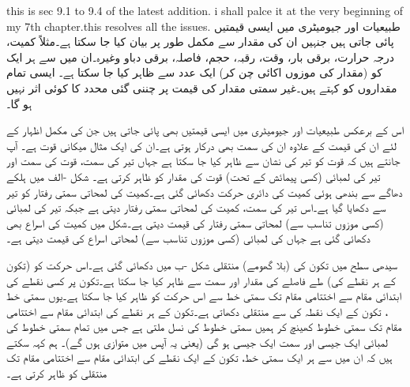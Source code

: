 this is sec 9.1 to 9.4 of the latest addition. i shall palce it at the very beginning of my 7th chapter.this resolves all the issues.
طبیعیات اور جیومیٹری میں ایسی قیمتیں پائی جاتی ہیں جنہیں ان کی مقدار سے مکمل طور پر بیان کیا جا سکتا ہے۔مثلاً  کمیت، درجہ حرارت، برقی بار، وقت، رقبہ، حجم، فاصلہ، برقی دباو وغیرہ۔ان میں سے ہر ایک کو (مقدار کی موزوں اکائی چن کر) ایک عدد  سے ظاہر کیا جا سکتا ہے۔ ایسی تمام مقداروں کو  کہتے ہیں۔غیر سمتی مقدار کی قیمت پر چننی گئی محدد کا کوئی اثر نہیں ہو گا۔

اس کے برعکس طبیعیات اور جیومیٹری میں ایسی قیمتیں بھی پائی جاتی ہیں جن کی مکمل اظہار کے لئے ان کی قیمت کے علاوہ ان کی سمت بھی درکار ہوتی ہے۔ان کی ایک مثال میکانی  قوت ہے۔ آپ جانتے ہیں کہ قوت کو تیر کی نشان سے ظاہر کیا جا سکتا ہے جہاں تیر کی سمت، قوت کی سمت اور تیر کی لمبائی (کسی پیمائش کے تحت) قوت کی مقدار کو ظاہر کرتی ہے۔ شکل -الف میں ہلکے دھاگے سے بندھی ہوئی کمیت  کی دائری حرکت دکھائی گئی ہے۔کمیت کی لمحاتی سمتی رفتار  کو تیر سے دکھایا گیا ہے۔اس تیر کی سمت، کمیت کی لمحاتی سمتی رفتار دیتی ہے جبکہ تیر کی لمبائی (کسی موزوں تناسب سے) لمحاتی سمتی رفتار کی قیمت دیتی ہے۔شکل میں کمیت کی اسراع  بھی دکھائی گئی ہے جہاں  کی لمبائی (کسی موزوں تناسب سے) لمحاتی اسراع کی قیمت دیتی ہے۔

سیدھی سطح میں تکون کی (بلا گھومے) منتقلی شکل -ب میں  دکھائی گئی ہے۔اس حرکت کو (تکون کے ہر نقطے کی) طے فاصلے  کی مقدار اور سمت سے ظاہر کیا جا سکتا ہے۔تکون پر کسی نقطے کی ابتدائی مقام  سے اختتامی مقام  تک سمتی خط سے اس حرکت کو ظاہر کیا جا سکتا ہے۔یوں سمتی خط ، تکون کے ایک نقطہ کی  سے  منتقلی دکھاتی ہے۔تکون کے ہر نقطے کی ابتدائی مقام سے اختتامی مقام تک سمتی خطوط کھینچ کر ہمیں سمتی خطوط کی نسل ملتی ہے جس میں تمام سمتی  خطوط کی لمبائی ایک جیسی  اور  سمت  ایک جیسی ہو گی (یعنی یہ آپس میں متوازی ہوں گے)۔ ہم کہہ سکتے ہیں کہ ان میں سے ہر ایک سمتی خط، تکون کے ایک نقطے کی ابتدائی مقام سے اختتامی مقام تک منتقلی کو ظاہر کرتی ہے۔ 


